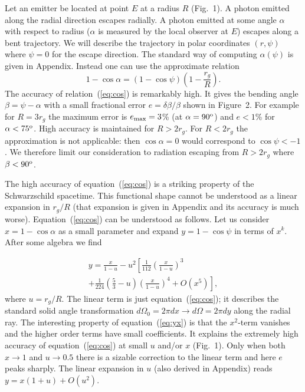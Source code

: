 \documentclass{article}
\def\dd{{ d}}
\def\dg{{\rm o}}
\def\be{\beta}
\begin{document}
Let an emitter be located at point $E$ at a radius $R$ (Fig.~1). 
A photon emitted along the radial direction escapes radially.
A photon emitted at some angle $\alpha$ with 
respect to radius ($\alpha$ is measured by the local observer at $E$) 
escapes along a bent trajectory. We will describe the trajectory
in polar coordinates $(r,\psi)$ where $\psi=0$ for the escape direction. 
The standard way of computing $\alpha(\psi)$ is given in Appendix. 
Instead one can use the approximate relation
\begin{equation}
\label{eq:cos}
    1-\cos\alpha=(1-\cos\psi)\left(1-\frac{r_g}{R}\right).
\end{equation}
The accuracy of relation~(\ref{eq:cos}) is remarkably high. It gives 
the bending angle $\beta=\psi-\alpha$ with a small fractional error 
$e=\delta\be/\be$ shown in Figure~2. For example for $R=3r_g$ the maximum 
error is $e_{\rm max}=3$\% (at $\alpha=90^\dg$) and $e<1$\% for 
$\alpha<75^\dg$. High accuracy is maintained for $R>2r_g$. For $R<2r_g$ the 
approximation is not applicable: then $\cos\alpha=0$ would correspond to 
$\cos\psi<-1$. 
We therefore limit our consideration to radiation escaping from 
$R>2r_g$ where $\be<90^\dg$. 

The high accuracy of equation~(\ref{eq:cos}) is a striking property of the 
Schwarzschild spacetime. This functional shape cannot be understood as a 
linear expansion in $r_g/R$ (that expansion is given in Appendix and its 
accuracy is much worse). Equation~(\ref{eq:cos}) can be understood as
follows. Let us consider $x=1-\cos\alpha$ as a small parameter and 
expand $y=1-\cos\psi$ in terms of $x^k$. After some algebra we find

\begin{eqnarray}
\label{eq:yx}
\nonumber
  y=\frac{x}{1-u}-u^2\left[\frac{1}{112}\left(\frac{x}{1-u}\right)^3
  \right. \\ \left.
  +\frac{1}{224}\left(\frac{5}{3}-u\right)\left(\frac{x}{1-u}\right)^4
   +O(x^5)\right],
\end{eqnarray}  
where $u=r_g/R$. The linear term is just equation~(\ref{eq:cos}); it describes 
the standard solid angle transformation 
$\dd\Omega_0=2\pi\dd x\rightarrow\dd\Omega=2\pi\dd y$ 
along the radial ray. The interesting property of equation~(\ref{eq:yx}) is that
the $x^2$-term vanishes and the higher order terms have small coefficients. 
It explains the extremely high accuracy of equation~(\ref{eq:cos})
at small $u$ and/or $x$ (Fig.~1). Only when both $x\rightarrow 1$ 
and $u\rightarrow 0.5$ there is a sizable correction to the linear term
and here $e$ peaks sharply. The linear expansion in $u$ (also derived
in Appendix) reads $y=x(1+u)+O(u^2)$.
\end{document}
